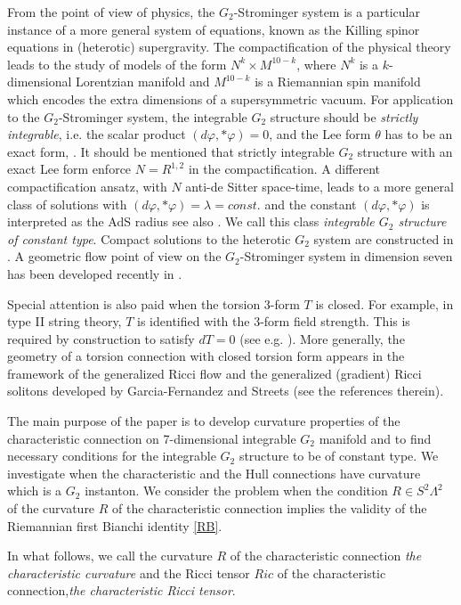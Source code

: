 \documentclass[10pt,british]{article}
\def\p{{\varphi}}
\begin{document}
From the point of view of physics, the $G_2$-Strominger system is a particular instance of a more
general system of equations, known as the Killing spinor equations in (heterotic) supergravity.
The compactification of the physical theory leads to the study of models of the form $N^k\times M^{10-k}$, where $N^k$ is a $k$-dimensional Lorentzian manifold and $M^{10-k}$ is a Riemannian spin
manifold which encodes the extra dimensions of a supersymmetric vacuum. 
 For application to the $G_2$-Strominger system, the integrable $G_2$ structure should be \emph{strictly integrable}, i.e. the scalar product $(d\p,*\p)=0$,  and the Lee form $\theta$ has to be an exact form, \cite{GKMW}.   It should be mentioned that strictly integrable  $G_2$ structure with an exact Lee form enforce $N=R^{1,2}$ in the compactification. A different compactification ansatz, with $N$ anti-de Sitter space-time, leads to a more general class of solutions with $(d\p,*\p)=\lambda=const.$ \cite{OLS} and the constant  $(d\p,*\p)$ is interpreted as the AdS radius \cite{Oss1,Oss2} see also  \cite[Section~5.2.1]{AMP}. We call this class \emph{integrable $G_2$ structure of constant type}.  Compact solutions to the heterotic $G_2$ system are constructed in \cite{FIUV1,OLM,LE}.  A geometric flow point of view on the  $G_2$-Strominger system in dimension seven has been developed recently in \cite{AMP}.
 
Special attention is also paid when the torsion 3-form $T$  is closed. For example, in type II string theory, $T$ is identified with the 3-form field strength. This is required by construction to satisfy $dT=0$  (see e.g. \cite{GKMW,GMW}).  
More generally, the geometry of a torsion connection with closed torsion form appears  in the framework of the generalized Ricci flow and the  generalized (gradient) Ricci solitons developed by Garcia-Fernandez and Streets \cite{GFS} (see  the references therein).

 
 The main purpose of the paper is to develop  curvature properties of the characteristic connection on 7-dimensional integrable $G_2$ manifold and to find necessary conditions for the integrable $G_2$ structure to be of constant type. We investigate  when the   characteristic and  the Hull connections have curvature which is a $G_2$ instanton. We consider the problem when the condition  $R\in S^2\Lambda^2$ of the curvature $R$ of the characteristic connection  implies the validity of the Riemannian first Bianchi identity \eqref{RB}.  
 
In what follows, we call  the curvature $R$ of the characteristic connection  \emph{the characteristic curvature } and the Ricci tensor $Ric$ of the characteristic connection,\emph{the characteristic Ricci tensor}.
 
\end{document}
